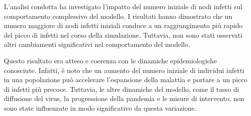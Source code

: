 L'analisi condotta ha investigato l'impatto del numero iniziale di 
nodi infetti sul comportamento complessivo del modello. 
I risultati hanno dimostrato che un numero maggiore di nodi infetti 
iniziali conduce a un raggiungimento più rapido del picco di infetti 
nel corso della simulazione. Tuttavia, non sono stati osservati altri 
cambiamenti significativi nel comportamento del modello.

Questo risultato era atteso e coerenza con le dinamiche epidemiologiche 
conosciute. Infatti, è noto che un aumento del numero iniziale di 
individui infetti in una popolazione può accelerare l'espansione della 
malattia e portare a un picco di infetti più precoce. 
Tuttavia, le altre dinamiche del modello, come il tasso di diffusione 
del virus, la progressione della pandemia e le misure di intervento, 
non sono state influenzate in modo significativo da questa variazione.


